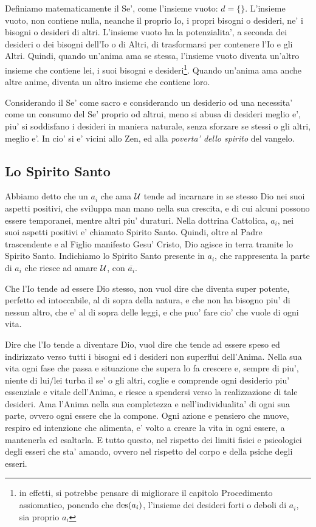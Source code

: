 Definiamo matematicamente il Se', come l'insieme vuoto: $d=\{\}$. L'insieme vuoto, non contiene nulla, neanche il proprio Io, i propri bisogni o desideri, ne' i bisogni o desideri di altri. L'insieme vuoto ha la potenzialita', a seconda dei desideri o dei bisogni dell'Io o di Altri, di trasformarsi per contenere l'Io e gli Altri. Quindi, quando un'anima ama se stessa, l'insieme vuoto diventa un'altro insieme che contiene lei, i suoi bisogni e desideri\footnote{in effetti, si potrebbe pensare di migliorare il capitolo Procedimento assiomatico, ponendo che $\textrm{des}(a_i)$, l'insieme dei desideri forti o deboli di $a_i$, sia proprio $a_i$}. Quando un'anima ama anche altre anime, diventa un altro insieme che contiene loro.

Considerando il Se' come sacro e considerando un desiderio od una necessita' come un consumo del Se' proprio od altrui, meno si abusa di desideri meglio e', piu' si soddisfano i desideri in maniera naturale, senza sforzare se stessi o gli altri, meglio e'. In cio' si e' vicini allo Zen, ed alla \emph{poverta' dello spirito} del vangelo.

\subsection{Lo Spirito Santo}
\label{definizioneAnimo}

\def\holySpirit#1{\overline{#1}}

Abbiamo detto che un $a_i$ che ama $\mathcal{U}$ tende ad incarnare in se stesso Dio nei suoi aspetti positivi, che sviluppa man mano nella sua crescita, e di cui alcuni possono essere temporanei, mentre altri piu' duraturi. Nella dottrina Cattolica, $a_i$, nei suoi aspetti positivi e' chiamato Spirito Santo. Quindi, oltre al Padre trascendente e al Figlio manifesto Gesu' Cristo, Dio agisce in terra tramite lo Spirito Santo. Indichiamo lo Spirito Santo presente in $a_i$, che rappresenta la parte di $a_i$ che riesce ad amare $\mathcal{U}$, con $\holySpirit{a_i}$.

Che l'Io tende ad essere Dio stesso, non vuol dire che diventa super potente, perfetto ed intoccabile, al di sopra della natura, e che non ha bisogno piu' di nessun altro, che e' al di sopra delle leggi, e che puo' fare cio' che vuole di ogni vita. 

Dire che l'Io tende a diventare Dio, vuol dire che tende ad essere speso ed indirizzato verso tutti i bisogni ed i desideri non superflui dell'Anima. Nella sua vita ogni fase che passa e situazione che supera lo fa crescere e, sempre di piu', niente di lui/lei turba il se' o gli altri, coglie e comprende ogni desiderio piu' essenziale e vitale dell'Anima, e riesce a spendersi verso la realizzazione di tale desideri. Ama l'Anima nella sua completezza e nell'individualita' di ogni sua parte, ovvero ogni essere che la compone. Ogni azione e pensiero che muove, respiro ed intenzione che alimenta, e' volto a creare la vita in ogni essere, a mantenerla ed esaltarla. E tutto questo, nel rispetto dei limiti fisici e psicologici degli esseri che sta' amando, ovvero nel rispetto del corpo e della psiche degli esseri.

